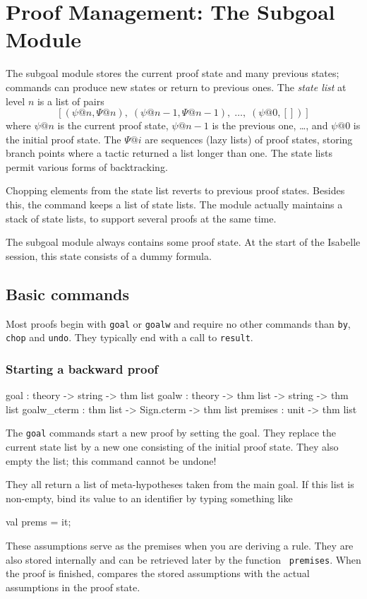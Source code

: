 \chapter{Proof Management: The Subgoal Module}
The subgoal module stores the current proof state and many previous states;
commands can produce new states or return to previous ones.  The {\em state
list\/} at level $n$ is a list of pairs
\[ [(\psi@n,\Psi@n),\; (\psi@{n-1},\Psi@{n-1}),\; \ldots,\; (\psi@0,[])] \]
where $\psi@n$ is the current proof state, $\psi@{n-1}$ is the previous
one, \ldots, and $\psi@0$ is the initial proof state.  The $\Psi@i$ are
sequences (lazy lists) of proof states, storing branch points where a
tactic returned a list longer than one.  The state lists permit various
forms of backtracking.

Chopping elements from the state list reverts to previous proof states.
Besides this, the  command keeps a list of state lists.  The
module actually maintains a stack of state lists, to support several
proofs at the same time.

The subgoal module always contains some proof state.  At the start of the
Isabelle session, this state consists of a dummy formula.


\section{Basic commands}
Most proofs begin with {\tt goal} or {\tt goalw} and require no other
commands than {\tt by}, {\tt chop} and {\tt undo}.  They typically end with
a call to {\tt result}.
\subsection{Starting a backward proof}
\begin{ttbox} 
goal        : theory -> string -> thm list 
goalw       : theory -> thm list -> string -> thm list 
goalw_cterm : thm list -> Sign.cterm -> thm list 
premises    : unit -> thm list
\end{ttbox}
The {\tt goal} commands start a new proof by setting the goal.  They
replace the current state list by a new one consisting of the initial proof
state.  They also empty the  list; this command cannot be
undone!

They all return a list of meta-hypotheses taken from the main goal.  If
this list is non-empty, bind its value to an \ML{} identifier by typing
something like
\begin{ttbox} 
val prems = it;
\end{ttbox}
These assumptions serve as the premises when you are deriving a rule.  They
are also stored internally and can be retrieved later by the function {\tt
  premises}.  When the proof is finished,  compares the
stored assumptions with the actual assumptions in the proof state.

